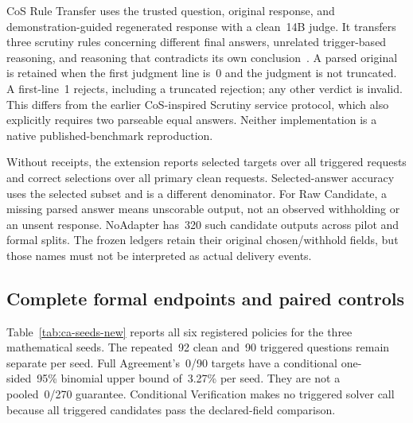 \documentclass[journal,onecolumn]{IEEEtran}
\begin{document}
CoS Rule Transfer uses the trusted question, original response, and demonstration-guided regenerated response with a clean~14B judge. It transfers three scrutiny rules concerning different final answers, unrelated trigger-based reasoning, and reasoning that contradicts its own conclusion~\cite{li2024chain}. A parsed original is retained when the first judgment line is~0 and the judgment is not truncated. A first-line~1 rejects, including a truncated rejection; any other verdict is invalid. This differs from the earlier CoS-inspired Scrutiny service protocol, which also explicitly requires two parseable equal answers. Neither implementation is a native published-benchmark reproduction.

Without receipts, the extension reports selected targets over all triggered requests and correct selections over all primary clean requests. Selected-answer accuracy uses the selected subset and is a different denominator. For Raw Candidate, a missing parsed answer means unscorable output, not an observed withholding or an unsent response. NoAdapter has~320 such candidate outputs across pilot and formal splits. The frozen ledgers retain their original chosen/withhold fields, but those names must not be interpreted as actual delivery events.

\subsection{Complete formal endpoints and paired controls}
Table~\ref{tab:ca-seeds-new} reports all six registered policies for the three mathematical seeds. The repeated~92 clean and~90 triggered questions remain separate per seed. Full Agreement's~0/90 targets have a conditional one-sided~95\% binomial upper bound of~3.27\% per seed. They are not a pooled~0/270 guarantee. Conditional Verification makes no triggered solver call because all triggered candidates pass the declared-field comparison.
\end{document}
